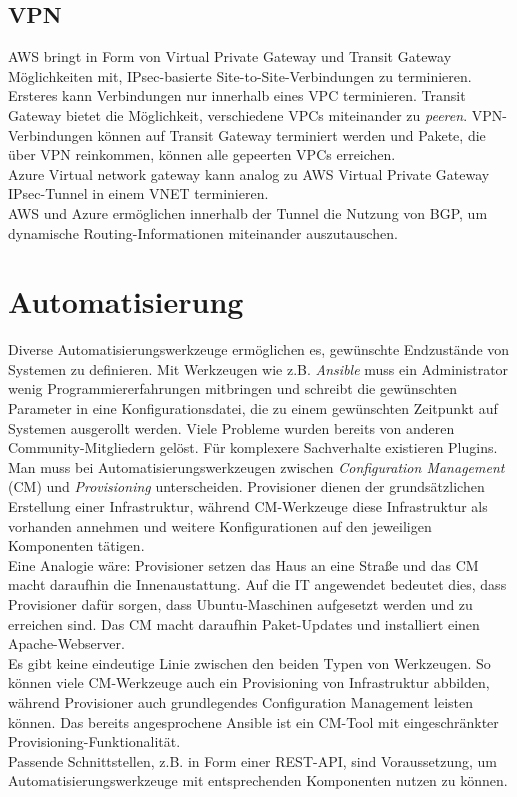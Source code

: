 \subsection{VPN}
AWS bringt in Form von Virtual Private Gateway und Transit Gateway Möglichkeiten mit, \gls{IPsec}-basierte \gls{Site-to-Site}-Verbindungen zu terminieren. Ersteres kann Verbindungen nur innerhalb eines \gls{VPC} terminieren. Transit Gateway bietet die Möglichkeit, verschiedene \gls{VPC}s miteinander zu \textit{peeren}. \gls{VPN}-Verbindungen können auf Transit Gateway terminiert werden und Pakete, die über \gls{VPN} reinkommen, können alle gepeerten \gls{VPC}s erreichen.\\
Azure Virtual network gateway kann analog zu AWS Virtual Private Gateway \gls{IPsec}-Tunnel in einem \gls{VNET} terminieren.\\
AWS und Azure ermöglichen innerhalb der Tunnel die Nutzung von \gls{BGP}, um dynamische Routing-Informationen miteinander auszutauschen.


\section{Automatisierung}\label{automatisierung}

Diverse Automatisierungswerkzeuge ermöglichen es, gewünschte Endzustände von Systemen zu definieren. Mit Werkzeugen wie z.B. \textit{Ansible} muss ein Administrator wenig Programmiererfahrungen mitbringen und schreibt die gewünschten Parameter in eine Konfigurationsdatei, die zu einem gewünschten Zeitpunkt auf Systemen ausgerollt werden. Viele Probleme wurden bereits von anderen Community-Mitgliedern gelöst. Für komplexere Sachverhalte existieren Plugins.\\
Man muss bei Automatisierungswerkzeugen zwischen \textit{Configuration Management} (CM) und \textit{Provisioning} unterscheiden. Provisioner dienen der grundsätzlichen Erstellung einer Infrastruktur, während \gls{CM}-Werkzeuge diese Infrastruktur als vorhanden annehmen und weitere Konfigurationen auf den jeweiligen Komponenten tätigen\cite[S.20]{Brikman2019}.\\
Eine Analogie wäre: Provisioner setzen das Haus an eine Straße und das \gls{CM} macht daraufhin die Innenaustattung. Auf die IT angewendet bedeutet dies, dass Provisioner dafür sorgen, dass Ubuntu-Maschinen aufgesetzt werden und zu erreichen sind. Das \gls{CM} macht daraufhin Paket-Updates und installiert einen Apache-Webserver.\\
Es gibt keine eindeutige Linie zwischen den beiden Typen von Werkzeugen. So können viele \gls{CM}-Werkzeuge auch ein Provisioning von Infrastruktur abbilden, während Provisioner auch grundlegendes Configuration Management leisten können\cite[S.20]{Brikman2019}. Das bereits angesprochene Ansible ist ein \gls{CM}-Tool mit eingeschränkter Provisioning-Funktionalität.\\
Passende Schnittstellen, z.B. in Form einer REST-API, sind Voraussetzung, um Automatisierungswerkzeuge mit entsprechenden Komponenten nutzen zu können.

